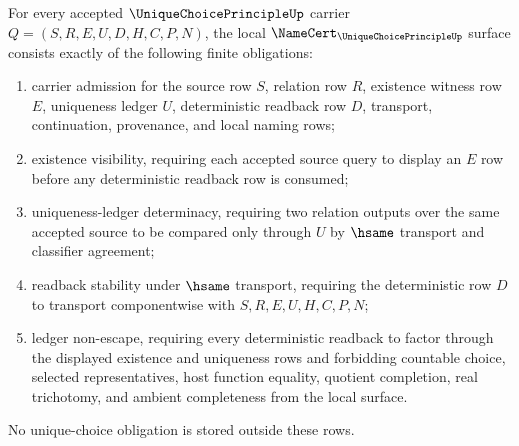 \begin{theorem}
\label{thm:unique-choice-principle-namecert-obligations}
For every accepted $\UniqueChoicePrincipleUp$ carrier $Q=(S,R,E,U,D,H,C,P,N)$, the local $\NameCert_{\UniqueChoicePrincipleUp}$ surface consists exactly of the following finite obligations:
\begin{enumerate}
\item carrier admission for the source row $S$, relation row $R$, existence witness row $E$, uniqueness ledger $U$, deterministic readback row $D$, transport, continuation, provenance, and local naming rows;
\item existence visibility, requiring each accepted source query to display an $E$ row before any deterministic readback row is consumed;
\item uniqueness-ledger determinacy, requiring two relation outputs over the same accepted source to be compared only through $U$ by $\hsame$ transport and classifier agreement;
\item readback stability under $\hsame$ transport, requiring the deterministic row $D$ to transport componentwise with $S,R,E,U,H,C,P,N$;
\item ledger non-escape, requiring every deterministic readback to factor through the displayed existence and uniqueness rows and forbidding countable choice, selected representatives, host function equality, quotient completion, real trichotomy, and ambient completeness from the local surface.
\end{enumerate}
No unique-choice obligation is stored outside these rows.
\end{theorem}
